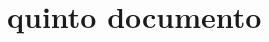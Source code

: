 \documentclass[assd_tp3_main.tex]{subfiles}
\begin{document}
\section{quinto documento}
\end{document}

